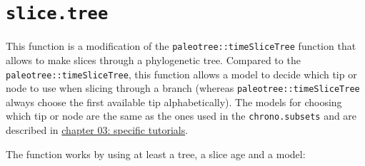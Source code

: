 \documentclass[
]{book}
\newenvironment{Shaded}{\begin{snugshade}}{\end{snugshade}}
\newcommand{\CommentTok}[1]{\textcolor[rgb]{0.56,0.35,0.01}{\textit{#1}}}
\newcommand{\DataTypeTok}[1]{\textcolor[rgb]{0.13,0.29,0.53}{#1}}
\newcommand{\DecValTok}[1]{\textcolor[rgb]{0.00,0.00,0.81}{#1}}
\newcommand{\FloatTok}[1]{\textcolor[rgb]{0.00,0.00,0.81}{#1}}
\newcommand{\KeywordTok}[1]{\textcolor[rgb]{0.13,0.29,0.53}{\textbf{#1}}}
\newcommand{\NormalTok}[1]{#1}
\newcommand{\OperatorTok}[1]{\textcolor[rgb]{0.81,0.36,0.00}{\textbf{#1}}}
\newcommand{\StringTok}[1]{\textcolor[rgb]{0.31,0.60,0.02}{#1}}
\begin{document}
\hypertarget{slice.tree}{%
\section{\texorpdfstring{\texttt{slice.tree}}{slice.tree}}\label{slice.tree}}

This function is a modification of the \texttt{paleotree::timeSliceTree} function that allows to make slices through a phylogenetic tree.
Compared to the \texttt{paleotree::timeSliceTree}, this function allows a model to decide which tip or node to use when slicing through a branch (whereas \texttt{paleotree::timeSliceTree} always choose the first available tip alphabetically).
The models for choosing which tip or node are the same as the ones used in the \texttt{chrono.subsets} and are described in \protect\hyperlink{chrono-subsets}{chapter 03: specific tutorials}.

The function works by using at least a tree, a slice age and a model:

\begin{Shaded}
\end{Shaded}
\end{document}
